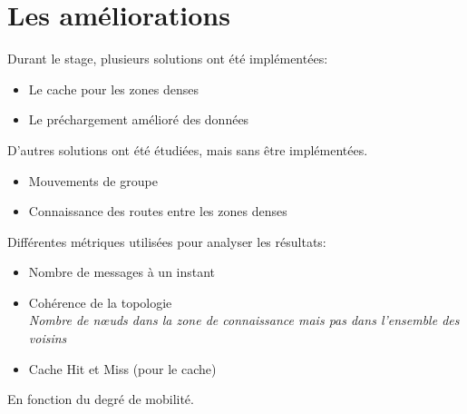 \documentclass{beamer}
\begin{document}
  \section{Les améliorations}
  \begin{frame}
	Durant le stage, plusieurs solutions ont été implémentées:
	\begin{itemize}
		\pause\item Le cache pour les zones denses
		\pause\item Le préchargement amélioré des données
	\end{itemize}
	\pause D'autres solutions ont été étudiées, mais sans être implémentées.
	\begin{itemize}
		\item Mouvements de groupe
		\item Connaissance des routes entre les zones denses
	\end{itemize}
  \end{frame}

  \begin{frame}
	Différentes métriques utilisées pour analyser les résultats:
	\begin{itemize}
		\item Nombre de messages à un instant 
		\item Cohérence de la topologie \\ \textit{\footnotesize{Nombre de nœuds dans la zone de connaissance mais pas dans l'ensemble des voisins}}
		\item Cache Hit et Miss (pour le cache)
	\end{itemize}
	\vspace{5mm}
	En fonction du degré de mobilité.
  \end{frame}

  
\end{document}

